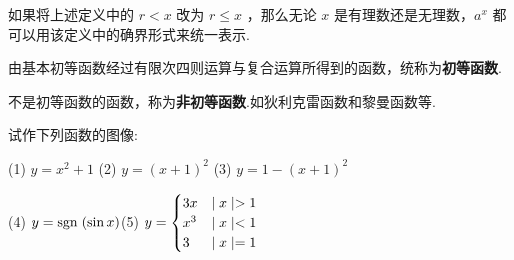 \begin{annotation}
    如果将上述定义中的 $r<x$ 改为 $r\le x$ ，那么无论 $x$ 是有理数还是无理数，$a^x$ 都可以用该定义中的确界形式来统一表示.
\end{annotation}

\begin{definition}[初等函数]
    由基本初等函数经过有限次四则运算与复合运算所得到的函数，统称为\textbf{初等函数}.
\end{definition}

不是初等函数的函数，称为\textbf{非初等函数}.如狄利克雷函数和黎曼函数等.

\homework

\begin{practice}
    试作下列函数的图像:
    
    (1) $y=x^2+1$ \qquad (2) $y=(x+1)^2$ \qquad (3) $y=1-(x+1)^2$ 
    
    (4) $y=\mbox{sgn}\hspace{3pt} (\sin x)$\qquad  (5) $y=\begin{cases}
        3x&\mid x \mid>1 \\
        x^3 & \mid x \mid<1 \\
        3 & \mid x \mid=1
    \end{cases}$
\end{practice}

